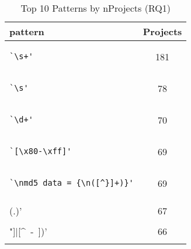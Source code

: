 \begin{table}
\begin{center}
\caption{Top 10 Patterns by nProjects (RQ1)}
\label{table:topNW}
\begin{small}
\begin{tabular}{lc}
\toprule
pattern & Projects \\ 
\midrule
\begin{minipage}{2.55in}
\begin{verbatim}
`\s+'\end{verbatim}
\end{minipage}
& 181 \\ 
\midrule
\begin{minipage}{2.4in}
\begin{verbatim}
`\s'\end{verbatim}
\end{minipage}
& 78 \\ 
\midrule
\begin{minipage}{2.4in}
\begin{verbatim}
`\d+'\end{verbatim}
\end{minipage}
& 70 \\ 
\midrule
\begin{minipage}{2.4in}
\begin{verbatim}
`[\x80-\xff]'\end{verbatim}
\end{minipage}
& 69 \\ 
\midrule
\begin{minipage}{2.4in}
\begin{verbatim}
`\nmd5_data = {\n([^}]+)}'\end{verbatim}
\end{minipage}
& 69 \\ 
\midrule
\begin{minipage}{2.4in}
\begin{verbatim}
`\\(.)'\end{verbatim}
\end{minipage}
& 67 \\ 
\midrule
\begin{minipage}{2.4in}
\begin{verbatim}
`([\\"]|[^\ -~])'\end{verbatim}
\end{minipage}
& 66 \\ 
\midrule
\begin{minipage}{2.4in}

\end{minipage}
\end{tabular}
\end{small}
\end{center}
\end{table}
